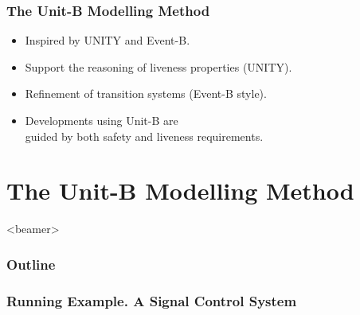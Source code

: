 \begin{frame}
  \frametitle{The Unit-B Modelling Method}

  \begin{itemize}
  \item Inspired by UNITY and Event-B.
    \medskip
  \item Support the reasoning of \alert{liveness properties} (UNITY).
    \medskip
  \item \alert{Refinement} of transition systems (Event-B style).
    \medskip
  \item Developments using Unit-B are \\
    \alert{guided by both safety and liveness requirements}.
  \end{itemize}
\end{frame}

\section{The Unit-B Modelling Method}
\label{sec:unit-b-modelling}
\begin{frame}<beamer>
  \frametitle{Outline}
  \tableofcontents[currentsection]
\end{frame}


\newcommand{\iI}{I}
\newcommand{\predP}{P}
\newcommand{\predQ}{Q}
\newcommand{\predR}{R}




\begin{frame}
  \frametitle{Running Example. A Signal Control System}

  \begin{center}
    
  \end{center}
  
  \begin{requirements}
    \ReqSpacing
  \end{requirements}
  
\end{frame}

